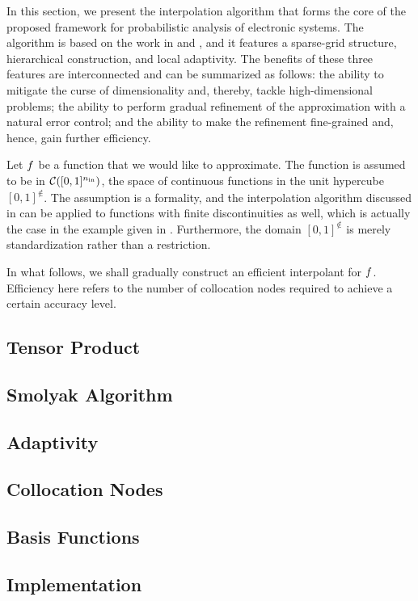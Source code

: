 In this section, we present the interpolation algorithm that forms the core of
the proposed framework for probabilistic analysis of electronic systems. The
algorithm is based on the work in \cite{klimke2006} and \cite{ma2009}, and it
features a sparse-grid structure, hierarchical construction, and local
adaptivity. The benefits of these three features are interconnected and can be
summarized as follows: the ability to mitigate the curse of dimensionality and,
thereby, tackle high-dimensional problems; the ability to perform gradual
refinement of the approximation with a natural error control; and the ability to
make the refinement fine-grained and, hence, gain further efficiency.

Let $f$ be a function that we would like to approximate. The function is
assumed to be in $\mathcal{C}([0, 1]^{n_\text{in}})$, the space of continuous functions
in the unit hypercube $[0, 1]^\nin$. The assumption is a formality, and the
interpolation algorithm discussed in  can be applied to
functions with finite discontinuities as well, which is actually the case in the
example given in . Furthermore, the domain $[0, 1]^\nin$ is
merely standardization rather than a restriction.

In what follows, we shall gradually construct an efficient interpolant for $f$.
Efficiency here refers to the number of collocation nodes required to achieve a
certain accuracy level.

\subsection{Tensor Product} 


\subsection{Smolyak Algorithm} 


\subsection{Adaptivity} 


\subsection{Collocation Nodes} 


\subsection{Basis Functions} 


\subsection{Implementation} 

